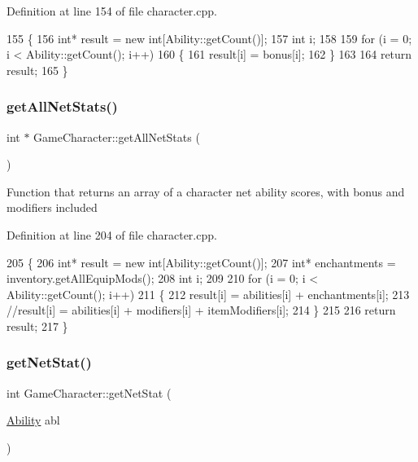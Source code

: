Definition at line 154 of file character.\+cpp.


\begin{DoxyCode}
155 \{
156     \textcolor{keywordtype}{int}* result = \textcolor{keyword}{new} \textcolor{keywordtype}{int}[Ability::getCount()];
157     \textcolor{keywordtype}{int} i;
158 
159     \textcolor{keywordflow}{for} (i = 0; i < Ability::getCount(); i++)
160     \{
161         result[i] = bonus[i];
162     \}
163 
164     \textcolor{keywordflow}{return} result;
165 \}
\end{DoxyCode}
\hypertarget{class_game_character_ab70746cb0cd382cbe56c0190a03a3024}{}\label{class_game_character_ab70746cb0cd382cbe56c0190a03a3024} 
\subsubsection{\texorpdfstring{get\+All\+Net\+Stats()}{getAllNetStats()}}
{\footnotesize\ttfamily int $\ast$ Game\+Character\+::get\+All\+Net\+Stats (\begin{DoxyParamCaption}{ }\end{DoxyParamCaption})}

Function that returns an array of a character net ability scores, with bonus and modifiers included 

Definition at line 204 of file character.\+cpp.


\begin{DoxyCode}
205 \{
206     \textcolor{keywordtype}{int}* result = \textcolor{keyword}{new} \textcolor{keywordtype}{int}[Ability::getCount()];
207     \textcolor{keywordtype}{int}* enchantments = inventory.getAllEquipMods();
208     \textcolor{keywordtype}{int} i;
209 
210     \textcolor{keywordflow}{for} (i = 0; i < Ability::getCount(); i++)
211     \{
212         result[i] = abilities[i] + enchantments[i];
213         \textcolor{comment}{//result[i] = abilities[i] + modifiers[i] + itemModifiers[i];}
214     \}
215 
216     \textcolor{keywordflow}{return} result;
217 \}
\end{DoxyCode}
\hypertarget{class_game_character_a94e6371f4f2f14c6a9e6aa9c8e78775b}{}\label{class_game_character_a94e6371f4f2f14c6a9e6aa9c8e78775b} 
\subsubsection{\texorpdfstring{get\+Net\+Stat()}{getNetStat()}}
{\footnotesize\ttfamily int Game\+Character\+::get\+Net\+Stat (\begin{DoxyParamCaption}\item[{\hyperlink{class_ability}{Ability}}]{abl }\end{DoxyParamCaption})}

